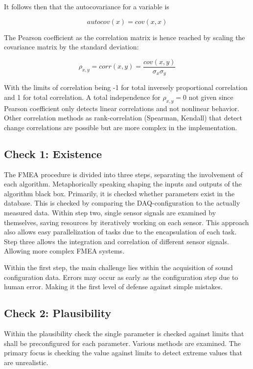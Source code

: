 It follows then that the autocovariance for a variable is

$$autocov(x) = cov(x,x)$$


The Pearson coefficient as the correlation matrix is hence reached by scaling the covariance matrix by the standard deviation: \cite{smith_scientist_1999}

$$\rho_{x,y} = corr(x,y)=\frac{cov(x,y)}{\sigma_x \sigma_y}$$

With the limits of correlation being -1 for total inversely proportional correlation and 1 for total correlation. A total independence for $\rho_{x,y}=0$ not given since Pearson coefficient only detects linear correlations and not nonlinear behavior. Other correlation methods as rank-correlation (Spearman, Kendall) that detect change correlations are possible but are more complex in the implementation.

\subsection{Check 1: Existence}
The FMEA procedure is divided into three steps, separating the involvement of each algorithm. Metaphorically speaking shaping the inputs and outputs of the algorithm black box. Primarily, it is checked whether parameters exist in the database. This is checked by comparing the DAQ-configuration to the actually measured data. Within step two, single sensor signals are examined by themselves, saving resources by iteratively working on each sensor. This approach also allows easy parallelization of tasks due to the encapsulation of each task. Step three allows the integration and correlation of different sensor signals. Allowing more complex FMEA systems.

Within the first step, the main challenge lies within the acquisition of sound configuration data. Errors may occur as early as the configuration step due to human error. Making it the first level of defense against simple mistakes.

\subsection{Check 2: Plausibility}
\label{chap:2-plausibility}

Within the plausibility check the single parameter is checked against limits that shall be preconfigured for each parameter. Various methods are examined. The primary focus is checking the value against limits to detect extreme values that are unrealistic.

